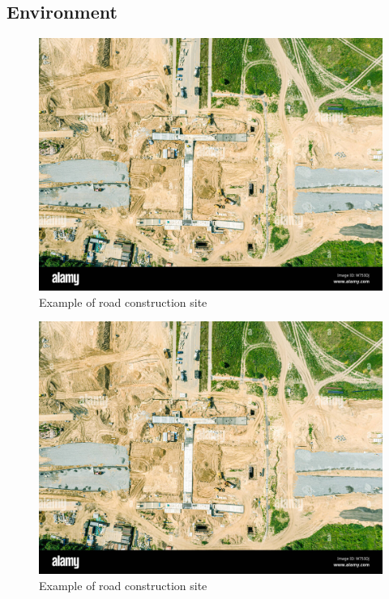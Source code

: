 \documentclass[conference]{IEEEtran}
\begin{document}
\subsection{Environment}
\begin{figure}[!ht]
	\includegraphics[width=\columnwidth]{graphs/road-construction-site-example.jpeg}
	\caption{Example of road construction site}
	\label{fig:construction-site}
\end{figure}
  \begin{figure}[!ht]
		\includegraphics[width=\columnwidth]{graphs/road-construction-site-example.jpeg}
		\caption{Example of road construction site}
		\label{fig:construction-site}
	\end{figure}
\end{document}
